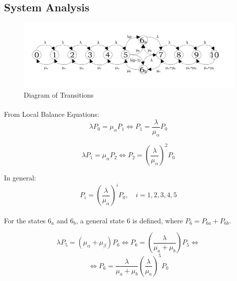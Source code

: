 \documentclass[a4paper, 11pt]{article}
\begin{document}
\begin{center}
\section*{System Analysis}
\end{center}

\begin{figure}[h]
  \centering
  \includegraphics[trim = 140 0 0 0, width = 14cm, keepaspectratio]{states.jpg}
  \caption{Diagram of Transitions}
\end{figure}

\paragraph{} From Local Balance Equations:
\begin{displaymath}
  \lambda P_0 = \mu_\alpha P_1 \Leftrightarrow P_1 = \frac{\lambda}{\mu_\alpha} P_0
\end{displaymath}

\begin{displaymath}
  \lambda P_1 = \mu_\alpha P_2 \Leftrightarrow P_2 = {\left(\frac{\lambda}{\mu_\alpha}\right)}^2 P_0
\end{displaymath}

In general:
\begin{equation}\label{pi5}
  P_i = {\left(\frac{\lambda}{\mu_\alpha}\right)}^i P_0,\quad i = 1, 2, 3, 4, 5
\end{equation}

\paragraph{} For the states $6_a$ and $6_b$, a general state 6 is defined,
where $P_6 = P_{6a} + P_{6b}$.

\begin{displaymath}
  \lambda P_5 = (\mu_\alpha + \mu_\beta)P_6 \Leftrightarrow
  P_6 = {\left(\frac{\lambda}{\mu_a + \mu_b}\right)} P_5 \Leftrightarrow
\end{displaymath}
\begin{equation}\label{p6}
  \Leftrightarrow P_6 = \frac{\lambda}{\mu_a + \mu_b} {\left(\frac{\lambda}{\mu_a}\right)}^5P_0
\end{equation}
\end{document}
